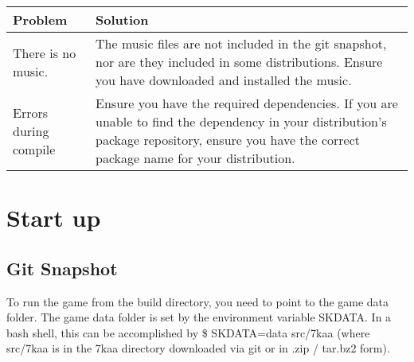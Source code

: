 \begin{tabular}{ | l | p{6cm} |}
	\hline
	Problem	& Solution \\ \hline
There is no music. & The music files are not included in the git snapshot, nor are they included in some distributions. Ensure you have downloaded and installed the music. \\ \hline
Errors during compile & Ensure you have the required dependencies. If you are unable to find the dependency in your distribution's package repository, ensure you have the correct package name for your distribution. \\
 \hline
\end{tabular}

\section{Start up}

\subsection{Git Snapshot}

To run the game from the build directory, you need to point to the game data folder. The game data folder is set by the environment variable SKDATA. In a bash shell, this can be accomplished by \$ SKDATA=data src/7kaa (where src/7kaa is in the 7kaa directory downloaded via git or in .zip / tar.bz2 form).





